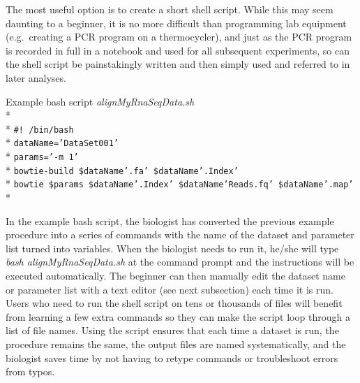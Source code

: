 \documentclass[ChapterTOCs,krantz2]{krantz} %
\begin{document}
The most useful option is to create a short shell script.  While this may seem
daunting to a beginner, it is no more difficult than programming lab
equipment (e.g.\ creating a PCR program on a thermocycler), and just as the PCR
program is recorded in full in a notebook and used for all subsequent
experiments, so can the shell script be painstakingly written and then simply
used and referred to in later analyses.  


Example bash script \emph{alignMyRnaSeqData.sh}\\* \\*
\texttt{\#! /bin/bash}\\*
\texttt{dataName='DataSet001'}\\*
\texttt{params='-m 1'}\\*
\texttt{bowtie-build \$dataName'.fa' \$dataName'.Index'}\\*
\texttt{bowtie \$params \$dataName'.Index' \$dataName'Reads.fq' \$dataName'.map' }\\*

In the example bash script, the biologist has converted the
previous example procedure into a series of commands with the name of the
dataset and parameter list turned into variables.  When the biologist needs
to run it, he/she will type \emph{bash alignMyRnaSeqData.sh} at the command prompt and
the instructions will be executed automatically.  The beginner can then
manually edit the dataset name or parameter list with a text editor (see next
subsection) each time it is run.  Users who
need to run the shell script on tens or thousands of files
will benefit from learning a few extra commands so they can make the script
loop through a list of file names.  Using the script ensures that each time a
dataset is run, the procedure remains the same, the output files are named
systematically, and the biologist saves time by not having to retype commands
or troubleshoot errors from typos.
\end{document}
